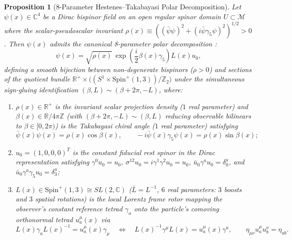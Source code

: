 \documentclass[11pt, a4paper]{article}
\newtheorem{proposition}[theorem]{Proposition}
\theoremstyle{definition}
\begin{document}
\begin{proposition}[8-Parameter Hestenes--Takabayasi Polar Decomposition]
\label{prop:takabayasi}
Let $\psi(x) \in \mathbb{C}^4$ be a Dirac bispinor field on an open regular spinor domain $U \subset \mathcal{M}$ where the scalar-pseudoscalar invariant $\rho(x) \equiv \left((\bar{\psi}\psi)^2 + (i\bar{\psi}\gamma_5\psi)^2\right)^{1/2} > 0$. Then $\psi(x)$ admits the canonical 8-parameter polar decomposition \cite{Takabayasi1952, Hestenes1990}:
\begin{equation}
\label{eq:takabayasi_polar}
\psi(x) = \sqrt{\rho(x)} \, \exp\left( \frac{i}{2} \beta(x) \gamma_5 \right) L(x) u_0,
\end{equation}
defining a smooth bijection between non-degenerate bispinors ($\rho > 0$) and sections of the quotient bundle $\mathbb{R}^+ \times \big((S^1 \times \text{Spin}^+(1,3))/\mathbb{Z}_2\big)$ under the simultaneous sign-gluing identification $(\beta, L) \sim (\beta + 2\pi, -L)$, where:
\begin{enumerate}[label=(\roman*), nosep]
    \item $\rho(x) \in \mathbb{R}^+$ is the invariant scalar projection density ($1$ real parameter) and $\beta(x) \in \mathbb{R}/4\pi\mathbb{Z}$ (with $(\beta + 2\pi, -L) \sim (\beta, L)$ reducing observable bilinears to $\beta \in [0, 2\pi)$) is the Takabayasi chiral angle ($1$ real parameter) satisfying
    \begin{equation}
    \label{eq:scalar_pseudoscalar_bilinears}
    \bar{\psi}(x)\psi(x) = \rho(x)\cos\beta(x), \qquad -i\bar{\psi}(x)\gamma_5\psi(x) = \rho(x)\sin\beta(x);
    \end{equation}
    \item $u_0 = (1, 0, 0, 0)^T$ is the constant fiducial rest spinor in the Dirac representation satisfying $\gamma^0 u_0 = u_0$, $\sigma^{12} u_0 = i\gamma^1\gamma^2 u_0 = u_0$, $\bar{u}_0 \gamma^a u_0 = \delta^a_0$, and $\bar{u}_0 \gamma^a \gamma_5 u_0 = \delta^a_3$;
    \item $L(x) \in \text{Spin}^+(1,3) \cong SL(2,\mathbb{C})$ ($\bar{L} = L^{-1}$, $6$ real parameters: $3$ boosts and $3$ spatial rotations) is the local Lorentz frame rotor mapping the observer's constant reference tetrad $\gamma_a$ onto the particle's comoving orthonormal tetrad $u_a^\mu(x)$ via
    \begin{equation}
    \label{eq:tetrad_rotor_map}
    L(x) \gamma_a L(x)^{-1} = u_a^\mu(x) \gamma_\mu \quad \Longleftrightarrow \quad L(x)^{-1} \gamma^\mu L(x) = u_a^\mu(x) \gamma^a, \qquad \eta_{\mu\nu} u_a^\mu u_b^\nu = \eta_{ab}.

\end{equation}
\end{enumerate}
\end{proposition}
\end{document}

